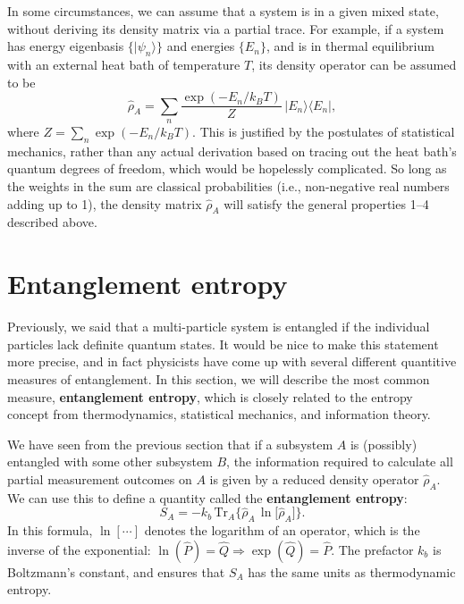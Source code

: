 \documentclass[prx,12pt]{revtex4-2}
\begin{document}
In some circumstances, we can assume that a system is in a given mixed
state, without deriving its density matrix via a partial trace.  For
example, if a system has energy eigenbasis $\{|\psi_n\rangle\}$ and
energies $\{E_n\}$, and is in thermal equilibrium with an external
heat bath of temperature $T$, its density operator can be assumed to
be
\begin{equation}
  \hat{\rho}_A = \sum_{n} \frac{\exp(-E_n/k_BT)}{Z} \, |E_n\rangle\langle E_n|,
\end{equation}
where $Z = \sum_n \exp(-E_n/k_BT)$.  This is justified by the
postulates of statistical mechanics, rather than any actual derivation
based on tracing out the heat bath's quantum degrees of freedom, which
would be hopelessly complicated.  So long as the weights in the sum
are classical probabilities (i.e., non-negative real numbers adding up
to 1), the density matrix $\hat{\rho}_A$ will satisfy the general
properties 1--4 described above.

\section{Entanglement entropy}
\label{sec:entropy}

Previously, we said that a multi-particle system is entangled if the
individual particles lack definite quantum states.  It would be nice
to make this statement more precise, and in fact physicists have come
up with several different quantitive measures of entanglement.  In
this section, we will describe the most common measure,
\textbf{entanglement entropy}, which is closely related to the
entropy concept from thermodynamics, statistical mechanics, and
information theory.

We have seen from the previous section that if a subsystem $A$ is
(possibly) entangled with some other subsystem $B$, the information
required to calculate all partial measurement outcomes on $A$ is given
by a reduced density operator $\hat{\rho}_A$.  We can use this to
define a quantity called the \textbf{entanglement entropy}:
\begin{equation}
  S_{A} = - k_b \, \mathrm{Tr}_A \Big\{ \hat{\rho}_A\, \ln\!\big[\hat{\rho}_A\big]\Big\}.
  \label{entropy}
\end{equation}
In this formula, $\ln[\cdots]$ denotes the logarithm of an operator,
which is the inverse of the exponential: $\ln(\hat{P}) = \hat{Q}
\Rightarrow \exp(\hat{Q}) = \hat{P}$.  The prefactor $k_b$ is
Boltzmann's constant, and ensures that $S_A$ has the same units as
thermodynamic entropy.
\end{document}
